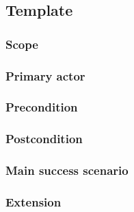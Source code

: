 \subsection{Template}

\subsubsection{Scope}

\subsubsection{Primary actor}

\subsubsection{Precondition}

\subsubsection{Postcondition}

\subsubsection{Main success scenario}

\subsubsection{Extension}
